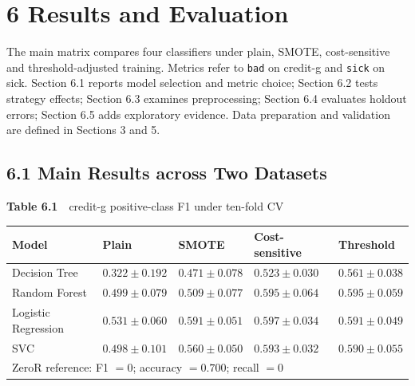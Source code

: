 \documentclass[12pt]{article}
\begin{document}
\section*{6 Results and Evaluation}

The main matrix compares four classifiers under plain, SMOTE, cost-sensitive and
threshold-adjusted training. Metrics refer to \texttt{bad} on credit-g and
\texttt{sick} on sick. Section 6.1 reports model selection and metric choice;
Section 6.2 tests strategy effects; Section 6.3 examines preprocessing;
Section 6.4 evaluates holdout errors; Section 6.5 adds exploratory evidence.
Data preparation and validation are defined in Sections 3 and 5.

\subsection*{6.1 Main Results across Two Datasets}

\begin{center}
\begin{minipage}{\textwidth}
\centering
{\footnotesize\textbf{Table 6.1}\ \ credit-g positive-class F1 under ten-fold CV}

\footnotesize
\begin{tabular}{p{1.35in}p{0.95in}p{0.95in}p{0.95in}p{0.95in}}
\toprule
Model & Plain & SMOTE & Cost-sensitive & Threshold \\
\midrule
Decision Tree & $0.322 \pm 0.192$ & $0.471 \pm 0.078$ & $0.523 \pm 0.030$ & $0.561 \pm 0.038$ \\
Random Forest & $0.499 \pm 0.079$ & $0.509 \pm 0.077$ & $0.595 \pm 0.064$ & $0.595 \pm 0.059$ \\
Logistic Regression & $0.531 \pm 0.060$ & $0.591 \pm 0.051$ & $\mathbf{0.597 \pm 0.034}$ & $0.591 \pm 0.049$ \\
SVC & $0.498 \pm 0.101$ & $0.560 \pm 0.050$ & $0.593 \pm 0.032$ & $0.590 \pm 0.055$ \\
\midrule
\multicolumn{5}{l}{ZeroR reference: F1 $=0$; accuracy $=0.700$; recall $=0$} \\
\bottomrule
\end{tabular}
\end{minipage}
\end{center}
\end{document}
